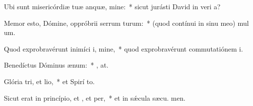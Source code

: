 \item Ubi sunt misericórdiæ tuæ anquæ, mine:~* sicut jurásti David in veri a?
\item Memor esto, Dómine, oppróbrii serrum turum:~* (quod contínui in sinu meo) mul um.
\item Quod exprobravérunt inimíci i, mine,~* quod exprobravérunt commutatiónem  i.
\item Benedíctus Dóminus  ænum:~* , at.
\item Glória tri, et lio,~* et Spirí to.
\item Sicut erat in princípio, et , et per,~* et in sǽcula sæcu. men.
